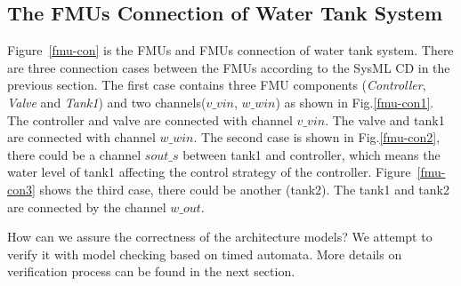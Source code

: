 \subsection{The FMUs  Connection of Water Tank System}
Figure~\ref{fmu-con} is the FMUs and FMUs connection of water tank system. There are three connection cases between the FMUs according to the SysML CD in the previous section. The first case contains three FMU components (\emph{Controller}, \emph{Valve} and \emph{ Tank1}) and two channels($v \_ vin$, $w \_ win$) as shown in Fig.\ref{fmu-con1}. The controller and valve are connected with channel $v \_ vin$. The valve and tank1 are connected with channel $w \_ win$. The second case is shown in Fig.\ref{fmu-con2}, there could be a channel $sout \_ s$ between tank1 and controller, which means the water level of tank1 affecting the control strategy of the controller. Figure~\ref{fmu-con3} shows the third case, there could be another (tank2). The tank1 and tank2 are connected by the channel $w \_ out$. 
\begin{figure}[htbp]
\end{figure}
How can we assure the correctness of the architecture models? We attempt to verify it with model checking based on timed automata. More details on verification process can be found in the next section.